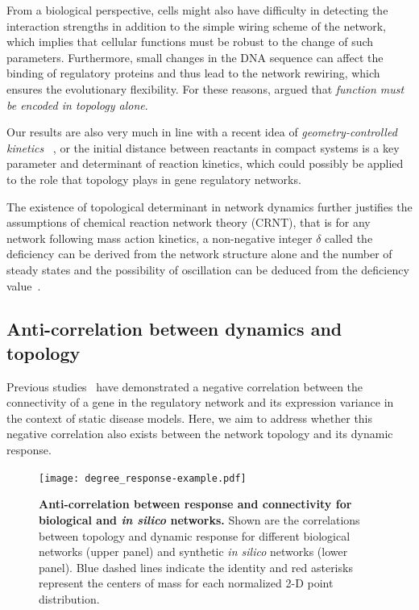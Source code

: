 From a biological perspective, cells might also have
difficulty in detecting the interaction strengths 
in addition to the simple wiring scheme of the
network, which implies that cellular functions must be
robust to the change of such parameters. Furthermore,
small changes in the DNA sequence can affect the binding
of regulatory proteins and thus lead to the network
rewiring, which ensures the evolutionary flexibility.
For these reasons, \cite{Tikhonov2013} argued that 
\emph{function must be encoded in topology alone}.

Our results are also very much in line with a 
recent idea of \emph{geometry-controlled kinetics}~%
\citep{Benichou2010}, or the 
initial distance between reactants in compact systems is 
a key parameter and determinant of reaction kinetics, which 
could possibly be applied to the role that topology plays 
in gene regulatory networks.

The existence of topological determinant in network dynamics
further justifies the assumptions of chemical reaction network
theory (CRNT), that is for any network following mass action kinetics,
a non-negative integer $\delta$ called the
deficiency can be derived from the network structure
alone and the number of steady states and the possibility of 
oscillation can be deduced from the deficiency value~\citep{Conradi2005}.

\subsection{Anti-correlation between dynamics and topology}
\label{sec:anti-correlation}

Previous studies~\citep{Lu2007a,Mar2011} have demonstrated a negative
correlation between the connectivity of a gene in the regulatory network
and its expression variance in the context of static disease models.
Here, we aim to address whether this negative correlation also exists 
between the network topology and its dynamic response.

\begin{figure}[!ht]
\begin{center}
\texttt{[image: degree\_response-example.pdf]}
\end{center}
\caption[Anti-correlation between response and connectivity]{
{\bf Anti-correlation between response and connectivity for biological and 
\emph{in silico} networks.} 
Shown are the correlations between topology and dynamic response for different
biological networks (upper panel) and synthetic \emph{in silico} networks
(lower panel). Blue dashed lines indicate the identity and red asterisks 
represent the centers of mass for each normalized 2-D point distribution.
}
\label{fig:degree_response_example}
\end{figure}


